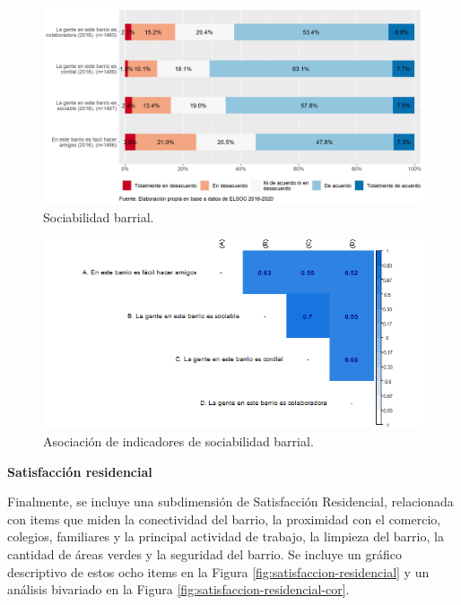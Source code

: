 \documentclass[
  12pt,
]{book}
\begin{document}
\begin{figure}[H]

{\centering \includegraphics[width=1\linewidth,height=1\textheight]{output/graphs/sociabilidad-barrial} 

}

\caption{Sociabilidad barrial.}\label{fig:sociabilidad-barrial}
\end{figure}

\begin{figure}[H]

{\centering \includegraphics[width=1\linewidth,height=1\textheight]{output/graphs/sociabilidad-barrial_cor} 

}

\caption{Asociación de indicadores de sociabilidad barrial.}\label{fig:sociabilidad-barrial-cor}
\end{figure}

\textbf{Satisfacción residencial}

Finalmente, se incluye una subdimensión de Satisfacción Residencial, relacionada con items que miden la conectividad del barrio, la proximidad con el comercio, colegios, familiares y la principal actividad de trabajo, la limpieza del barrio, la cantidad de áreas verdes y la seguridad del barrio. Se incluye un gráfico descriptivo de estos ocho items en la Figura \ref{fig:satisfaccion-residencial} y un análisis bivariado en la Figura \ref{fig:satisfaccion-residencial-cor}.
\end{document}
